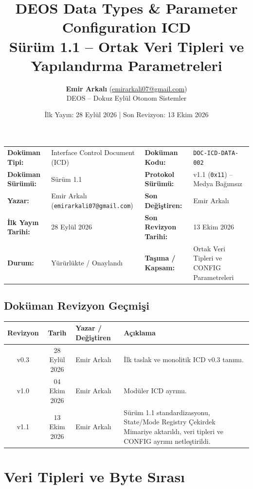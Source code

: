 \documentclass[a4paper,10pt]{article}
\title{\textbf{DEOS Data Types \& Parameter Configuration ICD}\\
\large Sürüm 1.1 -- Ortak Veri Tipleri ve Yapılandırma Parametreleri}
\author{\textbf{Emir Arkalı} (\href{mailto:emirarkali07@gmail.com}{emirarkali07@gmail.com})\\DEOS -- Dokuz Eylül Otonom Sistemler}
\date{İlk Yayın: 28 Eylül 2026 \quad | \quad Son Revizyon: 13 Ekim 2026}
\newcommand{\hex}[1]{\texttt{0x#1}}
\newcommand{\code}[1]{\texttt{#1}}
\begin{document}
\maketitle

\begin{center}
\small
\begin{tabularx}{\textwidth}{ll lX}
\toprule
\textbf{Doküman Tipi:} & Interface Control Document (ICD) & \textbf{Doküman Kodu:} & \code{DOC-ICD-DATA-002} \\
\textbf{Doküman Sürümü:} & Sürüm 1.1 & \textbf{Protokol Sürümü:} & v1.1 (\hex{11}) -- Medya Bağımsız \\
\textbf{Yazar:} & Emir Arkalı (\texttt{emirarkali07@gmail.com}) & \textbf{Son Değiştiren:} & Emir Arkalı \\
\textbf{İlk Yayın Tarihi:} & 28 Eylül 2026 & \textbf{Son Revizyon Tarihi:} & 13 Ekim 2026 \\
\textbf{Durum:} & Yürürlükte / Onaylandı & \textbf{Taşıma / Kapsam:} & Ortak Veri Tipleri ve CONFIG Parametreleri \\
\bottomrule
\end{tabularx}
\end{center}

\subsection*{Doküman Revizyon Geçmişi}
\begin{center}
\small
\begin{tabularx}{\textwidth}{c c l X}
\toprule
\textbf{Revizyon} & \textbf{Tarih} & \textbf{Yazar / Değiştiren} & \textbf{Açıklama} \\
\midrule
v0.3 & 28 Eylül 2026 & Emir Arkalı & İlk taslak ve monolitik ICD v0.3 tanımı. \\
v1.0 & 04 Ekim 2026 & Emir Arkalı & Modüler ICD ayrımı. \\
v1.1 & 13 Ekim 2026 & Emir Arkalı & Sürüm 1.1 standardizasyonu, State/Mode Registry Çekirdek Mimariye aktarıldı, veri tipleri ve CONFIG ayrımı netleştirildi. \\
\bottomrule
\end{tabularx}
\end{center}
\vspace{0.8em}


\section{Veri Tipleri ve Byte Sırası}
\end{document}
